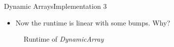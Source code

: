 


\begin{frame}{Dynamic Arrays}{Implementation 3}
  \begin{itemize}
    \item
      Now the runtime is linear with some bumps. Why?
  \end{itemize}
  \begin{figure}
    
    \vspace{-1.0em}
    \caption{Runtime of \textit{DynamicArray}}
    \label{fig:runtime_dynamic_array_impl3}
  \end{figure}
\end{frame}


